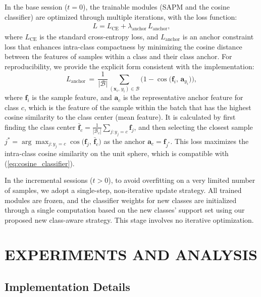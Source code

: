﻿\documentclass[letterpaper,journal]{IEEEtran}
\begin{document}
In the base session ($t=0$), the trainable modules (SAPM and the cosine classifier) are optimized through multiple iterations, with the loss function:
\begin{align}
L = L_{\text{CE}} + \lambda_{\text{anchor}}\,L_{\text{anchor}} \label{eq:base_loss_actual},
\end{align}where $L_{\text{CE}}$ is the standard cross-entropy loss, and $L_{\text{anchor}}$ is an anchor constraint loss that enhances intra-class compactness by minimizing the cosine distance between the features of samples within a class and their class anchor. For reproducibility, we provide the explicit form consistent with the implementation:
\begin{equation}
\label{eq:anchor_loss}
L_{\text{anchor}} \,=\, \frac{1}{|\mathcal{B}|}\sum_{(\mathbf{x}_i,\,y_i)\in\mathcal{B}} \Big(1 - \cos\big(\mathbf{f}_i,\,\mathbf{a}_{y_i}\big)\Big),
\end{equation}where $\mathbf{f}_i$ is the sample feature, and $\mathbf{a}_c$ is the representative anchor feature for class $c$, which is the feature of the sample within the batch that has the highest cosine similarity to the class center (mean feature). It is calculated by first finding the class center $\bar{\mathbf{f}}_c=\frac{1}{|\mathcal{B}_c|}\sum_{j:y_j=c}\mathbf{f}_j$, and then selecting the closest sample $j^{*}=\arg\max_{j:y_j=c} \cos\big(\mathbf{f}_j,\,\bar{\mathbf{f}}_c\big)$ as the anchor $\mathbf{a}_c=\mathbf{f}_{j^{*}}$. This loss maximizes the intra-class cosine similarity on the unit sphere, which is compatible with (\ref{eq:cosine_classifier}).

In the incremental sessions ($t>0$), to avoid overfitting on a very limited number of samples, we adopt a single-step, non-iterative update strategy. All trained modules are frozen, and the classifier weights for new classes are initialized through a single computation based on the new classes' support set using our proposed new class-aware strategy. This stage involves no iterative optimization.

\section{EXPERIMENTS AND ANALYSIS}
\subsection{Implementation Details}
\end{document}
